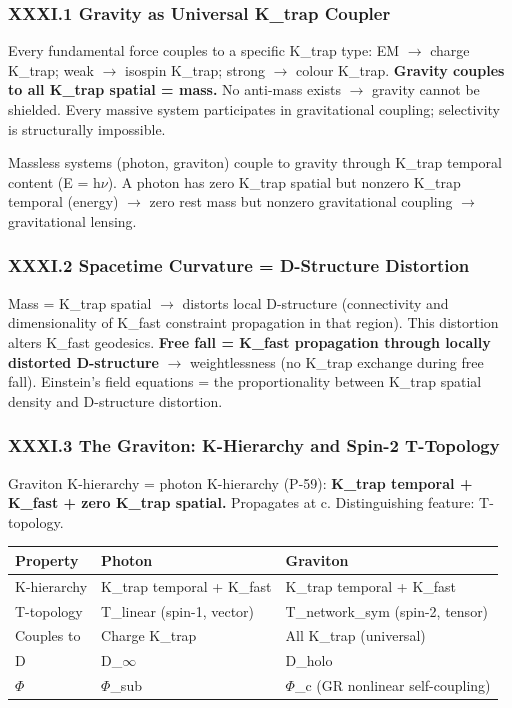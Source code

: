 \documentclass[12pt,a4paper]{article}
\begin{document}
\subsubsection{XXXI.1 Gravity as Universal K\_trap Coupler}

Every fundamental force couples to a specific K\_trap type: EM $\rightarrow$ charge K\_trap; weak $\rightarrow$ isospin K\_trap; strong $\rightarrow$ colour K\_trap. \textbf{Gravity couples to all K\_trap spatial = mass.} No anti-mass exists $\rightarrow$ gravity cannot be shielded. Every massive system participates in gravitational coupling; selectivity is structurally impossible.

Massless systems (photon, graviton) couple to gravity through K\_trap temporal content (E = h$\nu$). A photon has zero K\_trap spatial but nonzero K\_trap temporal (energy) $\rightarrow$ zero rest mass but nonzero gravitational coupling $\rightarrow$ gravitational lensing.

\subsubsection{XXXI.2 Spacetime Curvature = D-Structure Distortion}

Mass = K\_trap spatial $\rightarrow$ distorts local D-structure (connectivity and dimensionality of K\_fast constraint propagation in that region). This distortion alters K\_fast geodesics. \textbf{Free fall = K\_fast propagation through locally distorted D-structure} $\rightarrow$ weightlessness (no K\_trap exchange during free fall). Einstein's field equations = the proportionality between K\_trap spatial density and D-structure distortion.

\subsubsection{XXXI.3 The Graviton: K-Hierarchy and Spin-2 T-Topology}

Graviton K-hierarchy = photon K-hierarchy (P-59): \textbf{K\_trap temporal + K\_fast + zero K\_trap spatial.} Propagates at c. Distinguishing feature: T-topology.

\begin{table}[htbp]
\centering
\small
{}
\begin{tabularx}{\textwidth}{>{\centering\arraybackslash}X >{\centering\arraybackslash}X >{\centering\arraybackslash}X}
\toprule
\rowcolor{gray!25}\textbf{Property} & \textbf{Photon} & \textbf{Graviton} \\
\midrule
\rowcolors{1}{white}{gray!10}
K-hierarchy & K\_trap temporal + K\_fast & K\_trap temporal + K\_fast \\
T-topology & T\_linear (spin-1, vector) & T\_network\_sym (spin-2, tensor) \\
Couples to & Charge K\_trap & All K\_trap (universal) \\
D & D\_$\infty$ & D\_holo \\
$\Phi$ & $\Phi$\_sub & $\Phi$\_c (GR nonlinear self-coupling) \\
\bottomrule
\end{tabularx}
\end{table}
\end{document}

